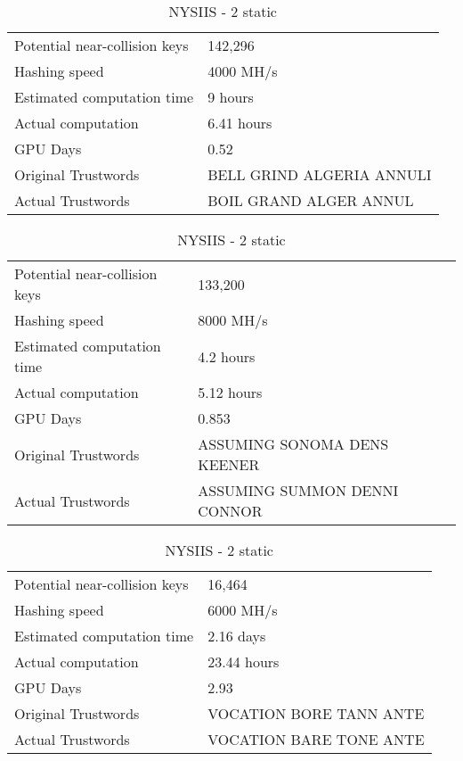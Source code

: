 \begin{table}[h!]
    \begin{tabular}{|l|l|}
        \hline
        Potential near-collision keys & 142,296 \\
        Hashing speed & 4000 MH/s \\
        Estimated computation time & 9 hours \\
        Actual computation & 6.41 hours \\
        GPU Days & 0.52 \\
        \hline
        Original Trustwords & BELL GRIND ALGERIA ANNULI \\
        Actual Trustwords   & BOIL GRAND ALGER ANNUL \\
        \hline
    \end{tabular}
    \caption{NYSIIS - 0 static}
    \label{tab:nysiis0}

    \begin{tabular}{|l|l|}
        \hline
        Potential near-collision keys & 133,200 \\
        Hashing speed & 8000 MH/s \\
        Estimated computation time & 4.2 hours \\
        Actual computation & 5.12 hours \\
        GPU Days & 0.853 \\
        \hline
        Original Trustwords & ASSUMING SONOMA DENS KEENER \\
        Actual Trustwords   & ASSUMING SUMMON DENNI CONNOR \\
        \hline
    \end{tabular}
    \caption{NYSIIS - 1 static}
    \label{tab:nysiis1}

    \begin{tabular}{|l|l|}
        \hline
        Potential near-collision keys & 16,464 \\
        Hashing speed & 6000 MH/s \\
        Estimated computation time & 2.16 days \\
        Actual computation & 23.44 hours \\
        GPU Days & 2.93 \\
        \hline
        Original Trustwords & VOCATION BORE TANN ANTE \\
        Actual Trustwords   & VOCATION BARE TONE ANTE \\
        \hline
    \end{tabular}
    \caption{NYSIIS - 2 static}

    \label{tab:nysiis2}
\end{table}

